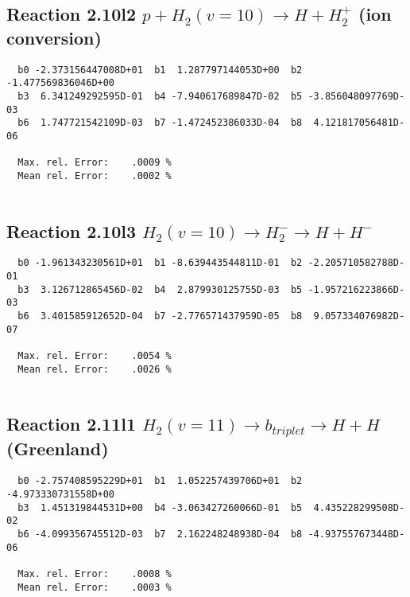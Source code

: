 \documentclass[12pt]{article}
\begin{document}
\subsection{
Reaction 2.10l2
$ p + H_2(v=10) \rightarrow H + H_2^+$ (ion conversion)
}


\begin{small}\begin{verbatim}
  b0 -2.373156447008D+01  b1  1.287797144053D+00  b2 -1.477569836046D+00
  b3  6.341249292595D-01  b4 -7.940617689847D-02  b5 -3.856048097769D-03
  b6  1.747721542109D-03  b7 -1.472452386033D-04  b8  4.121817056481D-06

  Max. rel. Error:    .0009 %
  Mean rel. Error:    .0002 %


\end{verbatim}\end{small}


\subsection{
Reaction 2.10l3
 $ H_2(v=10) \rightarrow H_2^- \rightarrow H + H^-$
}


\begin{small}\begin{verbatim}
  b0 -1.961343230561D+01  b1 -8.639443544811D-01  b2 -2.205710582788D-01
  b3  3.126712865456D-02  b4  2.879930125755D-03  b5 -1.957216223866D-03
  b6  3.401585912652D-04  b7 -2.776571437959D-05  b8  9.057334076982D-07

  Max. rel. Error:    .0054 %
  Mean rel. Error:    .0026 %


\end{verbatim}\end{small}


\newpage
\subsection{
Reaction 2.11l1
$ H_2(v=11) \rightarrow b_{triplet}\rightarrow H + H $ (Greenland) 
}


\begin{small}\begin{verbatim}
  b0 -2.757408595229D+01  b1  1.052257439706D+01  b2 -4.973330731558D+00
  b3  1.451319844531D+00  b4 -3.063427260066D-01  b5  4.435228299508D-02
  b6 -4.099356745512D-03  b7  2.162248248938D-04  b8 -4.937557673448D-06

  Max. rel. Error:    .0008 %
  Mean rel. Error:    .0003 %


\end{verbatim}\end{small}
\end{document}
